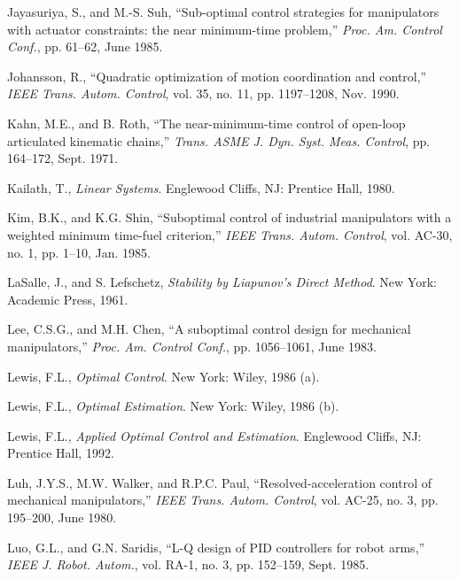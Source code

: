 \documentclass[UTF8]{ctexart}
\theoremstyle{definition}
\begin{document}
\begin{enumerate}[label={[\arabic*]}, leftmargin=*]
\item Jayasuriya, S., and M.-S. Suh, ``Sub-optimal control strategies for manipulators with actuator constraints: the near minimum-time problem,'' \textit{Proc. Am. Control Conf.}, pp. 61--62, June 1985.

\item Johansson, R., ``Quadratic optimization of motion coordination and control,'' \textit{IEEE Trans. Autom. Control}, vol. 35, no. 11, pp. 1197--1208, Nov. 1990.

\item Kahn, M.E., and B. Roth, ``The near-minimum-time control of open-loop articulated kinematic chains,'' \textit{Trans. ASME J. Dyn. Syst. Meas. Control}, pp. 164--172, Sept. 1971.

\item Kailath, T., \textit{Linear Systems}. Englewood Cliffs, NJ: Prentice Hall, 1980.

\item Kim, B.K., and K.G. Shin, ``Suboptimal control of industrial manipulators with a weighted minimum time-fuel criterion,'' \textit{IEEE Trans. Autom. Control}, vol. AC-30, no. 1, pp. 1--10, Jan. 1985.

\item LaSalle, J., and S. Lefschetz, \textit{Stability by Liapunov's Direct Method}. New York: Academic Press, 1961.

\item Lee, C.S.G., and M.H. Chen, ``A suboptimal control design for mechanical manipulators,'' \textit{Proc. Am. Control Conf.}, pp. 1056--1061, June 1983.

\item Lewis, F.L., \textit{Optimal Control}. New York: Wiley, 1986 (a).

\item Lewis, F.L., \textit{Optimal Estimation}. New York: Wiley, 1986 (b).

\item Lewis, F.L., \textit{Applied Optimal Control and Estimation}. Englewood Cliffs, NJ: Prentice Hall, 1992.

\item Luh, J.Y.S., M.W. Walker, and R.P.C. Paul, ``Resolved-acceleration control of mechanical manipulators,'' \textit{IEEE Trans. Autom. Control}, vol. AC-25, no. 3, pp. 195--200, June 1980.

\item Luo, G.L., and G.N. Saridis, ``L-Q design of PID controllers for robot arms,'' \textit{IEEE J. Robot. Autom.}, vol. RA-1, no. 3, pp. 152--159, Sept. 1985.


\end{enumerate}
\end{document}
